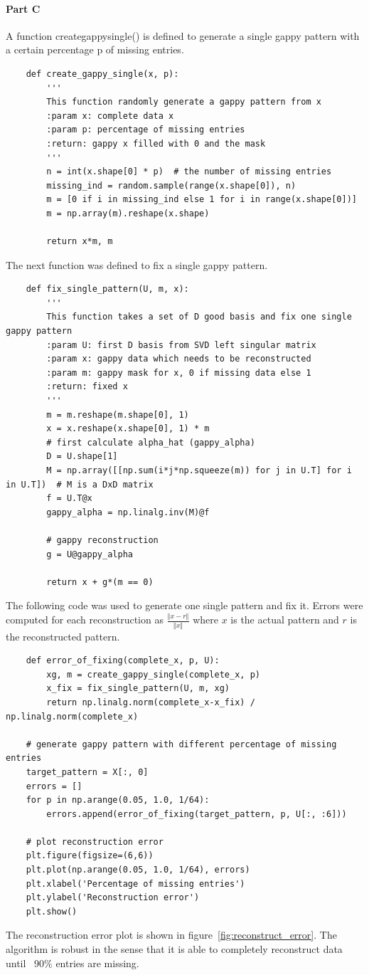 \documentclass{article}
\begin{document}
\paragraph{Part C} A function create\textunderscore gappy\textunderscore single() is defined to generate a single gappy pattern with a certain percentage p of missing entries. 
\begin{lstlisting}
	def create_gappy_single(x, p):
		'''
		This function randomly generate a gappy pattern from x
		:param x: complete data x
		:param p: percentage of missing entries
		:return: gappy x filled with 0 and the mask
		'''
		n = int(x.shape[0] * p)  # the number of missing entries
		missing_ind = random.sample(range(x.shape[0]), n)
		m = [0 if i in missing_ind else 1 for i in range(x.shape[0])]
		m = np.array(m).reshape(x.shape)
    
		return x*m, m
\end{lstlisting}
The next function was defined to fix a single gappy pattern. 
\begin{lstlisting}
	def fix_single_pattern(U, m, x):
		'''
		This function takes a set of D good basis and fix one single gappy pattern
		:param U: first D basis from SVD left singular matrix
		:param x: gappy data which needs to be reconstructed
		:param m: gappy mask for x, 0 if missing data else 1
		:return: fixed x
		'''
		m = m.reshape(m.shape[0], 1)
		x = x.reshape(x.shape[0], 1) * m
		# first calculate alpha_hat (gappy_alpha)
		D = U.shape[1]
		M = np.array([[np.sum(i*j*np.squeeze(m)) for j in U.T] for i in U.T])  # M is a DxD matrix
		f = U.T@x
		gappy_alpha = np.linalg.inv(M)@f

		# gappy reconstruction
		g = U@gappy_alpha

		return x + g*(m == 0)
\end{lstlisting}
The following code was used to generate one single pattern and fix it. Errors were computed for each reconstruction as $\frac{\Vert{x-r}\Vert}{\Vert{x}\Vert}$ where $x$ is the actual pattern and $r$ is the reconstructed pattern.
\begin{lstlisting}
	def error_of_fixing(complete_x, p, U):
		xg, m = create_gappy_single(complete_x, p)
		x_fix = fix_single_pattern(U, m, xg)
		return np.linalg.norm(complete_x-x_fix) / np.linalg.norm(complete_x)

	# generate gappy pattern with different percentage of missing entries
	target_pattern = X[:, 0]
	errors = []
	for p in np.arange(0.05, 1.0, 1/64):
		errors.append(error_of_fixing(target_pattern, p, U[:, :6]))

	# plot reconstruction error
	plt.figure(figsize=(6,6))
	plt.plot(np.arange(0.05, 1.0, 1/64), errors)
	plt.xlabel('Percentage of missing entries')
	plt.ylabel('Reconstruction error')
	plt.show()
\end{lstlisting}
The reconstruction error plot is shown in figure~\ref{fig:reconstruct_error}. The algorithm is robust in the sense that it is able to completely reconstruct data until ~90\% entries are missing. 
\end{document}
